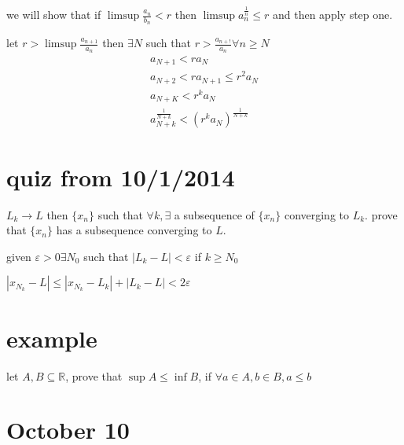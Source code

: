 \documentclass[letterpaper]{article}
\begin{document}
we will show that if $\limsup \frac{a_n}{b_n}<r$ then $\limsup a_n^{\frac{1}{n}}\le r$ and then apply step one.

let $r>\limsup \frac{a_{n+1}}{a_n}$ then $\exists N$ such that $r>\frac{a_{n+!}}{a_n}\forall n\ge N$
\begin{align*}
  a_{N+1}<ra_N\\
  a_{N+2}<ra_{N+1}\le r^2a_{N}\\
  a_{N+K}<r^{k}a_N\\
  a_{N+k}^{\frac{1}{N+k}}<(r^ka_N)^{\frac{1}{N+k}}
\end{align*}
\section*{quiz from 10/1/2014}
$L_k\to L$ then $\{x_n\}$ such that $\forall k, \exists$ a subsequence of $\{x_n\}$ converging to $L_k$. prove that $\{x_n\}$ has a subsequence converging to $L$.

given $\varepsilon>0\exists N_0$ such that $\left\lvert L_k-L\right\rvert<\varepsilon$ if $k\ge N_0$

$\left\lvert x_{N_k}-L\right\rvert\le\left\lvert x_{N_k}-L_k\right\rvert+\left\lvert L_k-L\right\rvert<2\varepsilon$

\section*{example}
let $A,B\subseteq \mathbb{R}$, prove that $\sup A\le\inf B$, if $\forall a\in A, b\in B, a\le b$
\section*{October 10}
\end{document}

